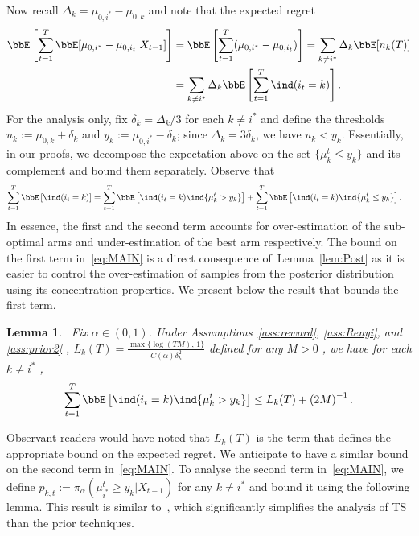 \documentclass[11pt]{article}
\newtheorem{lemma}[theorem]{Lemma}
\begin{document}
    Now recall $\Delta_k = \mu_{0,i^*} -  \mu_{0,k}$ and note that the expected regret 
    \begin{align*}
       \bbE\left[\sum_{t=1}^{T} \bbE[ \mu_{0,i^*} -  \mu_{0,i_t}|X_{t-1} ]\right ]&= \bbE  \left[ \sum_{t=1}^{T}(\mu_{0,i^*} -  \mu_{0,i_t})  \right] 
       = \sum_{k\neq i^*}  \Delta_k \bbE[n_{k}(T)] 
       \\
       &= \sum_{k\neq i^*} \Delta_k \bbE\left[\sum_{t=1}^{T}\ind( i_t=k )\right].
    \end{align*}
     For the analysis only, fix $\delta_k = \Delta_k/3$ for each $k \neq i^*$ and define the thresholds $u_k := \mu_{0,k} + \delta_k$ and $y_k := \mu_{0,i^*} - \delta_k$; since $\Delta_k = 3\delta_k$, we have $u_k < y_k$. %
     Essentially, in our proofs, we decompose the expectation above on the set $\{\mu_k^t \leq y_k\} $ and its complement and bound them separately. Observe that
    \begin{align} 
        \sum_{t=1}^{T} \bbE\left[  \ind(i_t=k )\right] &=  \sum_{t=1}^{T} \bbE\left[  \ind(i_t=k )  \ind\{\mu_k^t > y_k  \}   \right]
        + \sum_{t=1}^{T} \bbE\left[  \ind(i_t=k )  \ind\{\mu_k^t \leq y_k  \}   \right] .
        \label{eq:MAIN}
        \end{align}
        In essence, the first and the second term accounts for over-estimation of the sub-optimal arms and under-estimation of the best arm respectively. 
         The bound on the first term in~\eqref{eq:MAIN} is a direct consequence of~Lemma~\ref{lem:Post} as it is easier to control the over-estimation of samples from the posterior distribution using its concentration properties. We present below the result that bounds the first term.
        \begin{lemma}~\label{lem:Int4}
            Fix $\alpha\in(0,1)$.    Under Assumptions~\ref{ass:reward}, \ref{ass:Renyi}, and \ref{ass:prior2} , $L_k(T)= \frac{\max\{\log(TM),\,1\}}{C(\alpha)\delta_k^2}$ defined for any $M>0$ , %
            we have for each $k\neq i^*$ , 
            \begin{align}
            \sum_{t=1}^{T} \bbE\left[  \ind(i_t=k )  \ind\{\mu_k^t > y_k  \}   \right] \leq L_k(T)  + \left(2M \right)^{-1}.
            \end{align}
        \end{lemma}
        Observant readers would have noted that $L_k(T)$ is the term that defines the appropriate bound on the expected regret. We anticipate to have a similar bound on the second term in~\eqref{eq:MAIN}. To analyse the second term in~\eqref{eq:MAIN}, we define $p_{k,t}:= \pi_{\alpha}( \mu_{i^*}^{t} \geq y_k | X_{t-1} )$ for any $k \neq i^*$ and bound it using the following lemma. This result is similar to~\cite[Lemma 2.8]{agrawal2013further}, which significantly simplifies the analysis of TS than the prior techniques.
\end{document}
